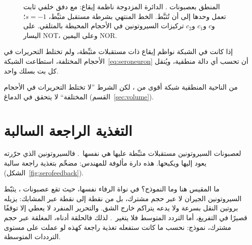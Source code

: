 \begin{figure}[t]
\centering
{}
\caption{المنطق بعصبونات . الدائرة المزدوجة ناظمة إيقاع: مع دفق خلفي ثابت تعمل وحدها إلى أن تُثبَّط. الخط المنتهي بشرطة مستقبل مثبِّط، $s=-1$؛ و$c$ و$c_1$ و$c_2$ تركيزات السيروتونين في الأحجام المحيطة بالمتلقي. على اليسار \foreignlanguage{english}{NOT}، وعلى اليمين \foreignlanguage{english}{NOR}.}
\label{fig:serogates}
\end{figure}

\begin{keyblock}
\begin{proposition}
\label{prop:serocomplete}
إذا كانت في الشبكة نواظم إيقاع ذات مستقبلات مثبِّطة، ولم تختلط التحريرات في الأحجام المختلفة، استطاعت الشبكة~\eqref{eq:seroneuron} أن تحسب أي دالة منطقية، ويُنقل كل بت بسلك واحد.
\end{proposition}
\end{keyblock}

من الناحية المنطقية شبكة  أقوى من ، لكن الشرط ”لا تختلط التحريرات في الأحجام المختلفة“ لا يتحقق في الدماغ (القسم~\ref{sec:volume}).

\section{التغذية الراجعة السالبة}

لعصبونات السيروتونين مستقبلات مثبِّطة عليها هي نفسها~\cite{Sprouse1987}. فالسيروتونين الذي حرّرته يعود إليها ويكبحها. هذه دارة مألوفة للمهندس: مضخّم بتغذية راجعة سالبة (الشكل~\ref{fig:serofeedback}).

ما المقيس هنا وما النموذج؟ في نواة الرفاء نفسها، حيث تقع عصبونات ، يثبّط السيروتونين الجيران لا عبر حجم مشترك، بل من نقطة إلى نقطة عبر المشابك: يزيله بروتين النقل بسرعة ولا يدعه يتراكم خارج الشق. والتحرير المنفرد لا يعطي إلا توقفًا قصيرًا في التفريغ، أما التردد المتوسط فلا يتغير~\cite{CourtneyFord2016}. لذلك فالحلقة أدناه، المغلقة عبر حجم مشترك، نموذج: نحسب ما كانت ستفعله تغذية راجعة كهذه لو عملت على مستوى الترددات المتوسطة.


